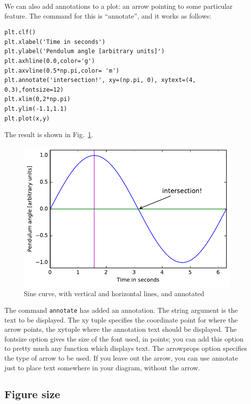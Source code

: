 \documentclass[twocolumn,apj]{openjournal}
\begin{document}
We can also add annotations to a plot: an arrow pointing to some particular feature. The command for this is ``annotate'', and it works as follows:
\begin{lstlisting}
plt.clf()
plt.xlabel('Time in seconds')
plt.ylabel('Pendulum angle [arbitrary units]')
plt.axhline(0.0,color='g')
plt.axvline(0.5*np.pi,color= 'm')
plt.annotate('intersection!', xy=(np.pi, 0), xytext=(4, 0.3),fontsize=12)
plt.xlim(0,2*np.pi)
plt.ylim(-1.1,1.1)
plt.plot(x,y)
\end{lstlisting}
The result is shown in Fig.~\ref{SinPlotAnnotated}.
\begin{figure}[htbp]
\begin{center}
\includegraphics[width=\linewidth]{sinplot-annotated.pdf}
\caption{Sine curve, with vertical and horizontal lines, and annotated}
\label{SinPlotAnnotated}
\end{center}
\end{figure}
The command \verb|annotate| has added an annotation. The string argument is the text to be displayed. The xy tuple specifies the coordinate point for where the arrow points, the xytuple where the annotation text should be displayed. The fontsize option gives the size of the font used, in points; you can add this option to pretty much any function which displays text. The arrowprops option specifies the type of arrow to be used. If you leave out the arrow, you can use annotate just to place text somewhere in your diagram, without the arrow.

\subsection{Figure size}
\end{document}
